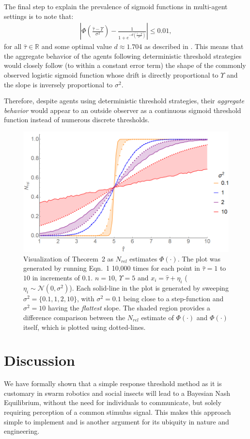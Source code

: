 \documentclass[smallextended]{svjour3}       %
\def\R{\mathbb{R}}    %
\def\td{\Upsilon}     %
\begin{document}
The final step to explain the prevalence of sigmoid functions in multi-agent settings is to note that:
\begin{align*}
|\Phi(\frac{\hat{\tau}-\td}{\sigma^2})-\frac{1}{1+e^{-d(\frac{\hat{\tau}-\td}{\sigma^2})}}|\leq 0.01,
\end{align*}
for all $\hat{\tau}\in\R$ and some optimal value $d\approx 1.704$ as described in \citep{Camilli1994}. This means that the aggregate behavior of the agents following deterministic threshold strategies would closely follow (to within a constant error term) the shape of the commonly observed logistic sigmoid function whose drift is directly proportional to $\td$ and the slope is inversely proportional to $\sigma^2$. 

Therefore, despite agents using deterministic threshold strategies, their \emph{aggregate behavior} would appear to an outside observer as a continuous sigmoid threshold function instead of numerous discrete thresholds.
\begin{figure}[!ht]
	\centering\includegraphics[width=0.6\columnwidth]{figures/thm2fig.png}
	\centering\caption{Visualization of Theorem~2 as $N_{rel}$ estimates $\Phi(\cdot)$. The plot was generated by running Eqn.~1 10,000 times for each point in $\hat{\tau} = 1$ to $10$ in increments of $0.1$. $n = 10$, $\td = 5$ and $x_i = \hat{\tau} + \eta_i$ ($\eta_i \sim\mathcal{N}(0, \sigma^2)$). Each solid-line in the plot is generated by sweeping $\sigma^2 = \{0.1, 1, 2, 10\}$, with $\sigma^2 = 0.1$ being close to a step-function and $\sigma^2 = 10$ having the \emph{flattest} slope. The shaded region provides a difference comparison between the $N_{rel}$ estimate of $\Phi(\cdot)$ and $\Phi(\cdot)$ itself, which is plotted using dotted-lines.}\label{fig:thm2fig}
\end{figure}

\section{Discussion}
We have formally shown that a simple response threshold method as it is customary in swarm robotics and social insects will lead to a Bayesian Nash Equilibrium, without the need for individuals to communicate, but solely requiring perception of a common stimulus signal. This makes this approach simple to implement and is another argument for its ubiquity in nature and engineering. 
\end{document}
